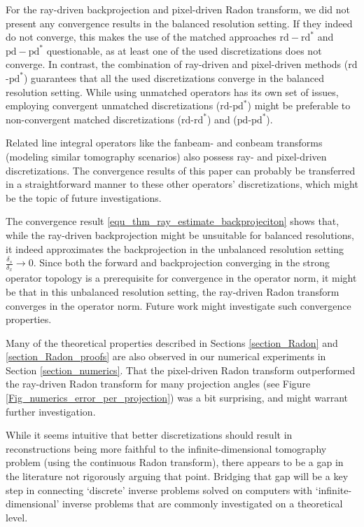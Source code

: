 \documentclass[11pt,reqno]{amsart}
\numberwithin{theorem}{section}
\theoremstyle{remark}
\begin{document}
For the ray-driven backprojection and pixel-driven Radon transform, we did not present any convergence results in the balanced resolution setting. If they indeed do not converge, this makes the use of the matched approaches $\mathrm{rd}-\mathrm{rd}^*$ and $\mathrm{pd}-\mathrm{pd}^*$ questionable, as at least one of the used discretizations does not converge. 
In contrast, the combination of ray-driven and pixel-driven methods ($\mathrm{rd}$-$\mathrm{pd}^*$) guarantees that all the used discretizations converge in the balanced resolution setting. While using unmatched operators has its own set of issues, employing convergent unmatched discretizations ($\mathrm{rd}$-$\mathrm{pd}^*$) might be preferable to non-convergent matched discretizations ($\mathrm{rd}$-$\mathrm{rd}^*$) and ($\mathrm{pd}$-$\mathrm{pd}^*$).
 
 
 Related line integral operators like the fanbeam- and conbeam transforms (modeling similar tomography scenarios) also possess ray- and pixel-driven discretizations.
 The convergence results of this paper can probably be transferred in a straightforward manner to these other operators' discretizations, which might be the topic of future investigations.
 

The convergence result \eqref{equ_thm_ray_estimate_backprojeciton} shows that, while the ray-driven backprojection might be unsuitable for balanced resolutions, it indeed approximates the backprojection in the unbalanced resolution setting $\frac{\delta_s}{\delta_x}\to 0$. Since both the forward and backprojection converging in the strong operator topology is a prerequisite for convergence in the operator norm, it might be that in this unbalanced resolution setting, the ray-driven Radon transform converges in the operator norm.
Future work might investigate such convergence properties. 

Many of the theoretical properties described in Sections \ref{section_Radon} and \ref{section_Radon_proofs} are also observed in our numerical experiments in Section \ref{section_numerics}. That the pixel-driven Radon transform outperformed the ray-driven Radon transform for many projection angles (see Figure \ref{Fig_numerics_error_per_projection}) was a bit surprising, and might warrant further investigation.


While it seems intuitive that better discretizations should result in reconstructions being more faithful to the infinite-dimensional tomography problem (using the continuous Radon transform), there appears to be a gap in the literature not rigorously arguing that point. Bridging that gap will be a key step in connecting `discrete' inverse problems solved on computers with `infinite-dimensional' inverse problems that are commonly investigated on a theoretical level.
\end{document}
